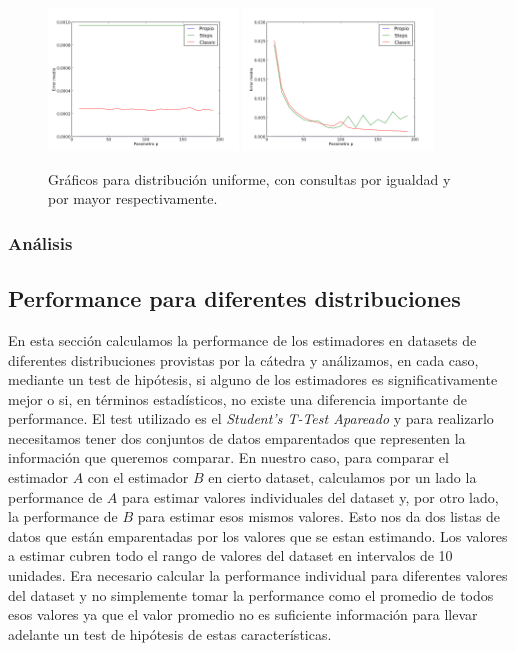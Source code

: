 \begin{figure}[h!]  
  \centering
  \includegraphics[width=0.45\textwidth]{images/uniformeEqual}
  \includegraphics[width=0.45\textwidth]{images/uniformeGreater}
  \caption{Gráficos para distribución uniforme, con consultas por igualdad y por mayor respectivamente.}
 \end{figure}

 \subsubsection*{Análisis}




\subsection{Performance para diferentes distribuciones}
En esta sección calculamos la performance de los estimadores en datasets de diferentes distribuciones provistas por la cátedra y análizamos, en cada caso, mediante un test de hipótesis, si alguno de los estimadores es significativamente mejor o si, en términos estadísticos, no existe una diferencia importante de performance. 
El test utilizado es el \textit{Student’s T-Test Apareado} y para realizarlo necesitamos tener dos conjuntos de datos emparentados que representen la información que queremos comparar. En nuestro caso, para comparar el estimador $A$ con el estimador $B$ en cierto dataset, calculamos por un lado la performance de $A$ para estimar valores individuales del dataset y, por otro lado, la performance de $B$ para estimar esos mismos valores. Esto nos da dos listas de datos que están emparentadas por los valores que se estan estimando. Los valores a estimar cubren todo el rango de valores del dataset en intervalos de 10 unidades. Era necesario calcular la performance individual para diferentes valores del dataset y no simplemente tomar la performance como el promedio de todos esos valores ya que el valor promedio no es suficiente información para llevar adelante un test de hipótesis de estas características.

